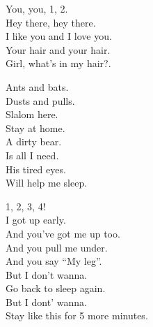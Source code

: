 \begin{specialChapterEnvironment}


\label{ep:teenage-gizzard}




You, you, 1, 2. \\

Hey there, hey there. \\
I like you and I love you. \\
Your hair and your hair. \\

Girl, what's in my hair?. \\




Ants and bats. \\
Dusts and pulls. \\
Slalom here. \\
Stay at home. \\

A dirty bear. \\
Is all I need. \\
His tired eyes. \\
Will help me sleep. \\




1, 2, 3, 4! \\

I got up early. \\
And you've got me up too. \\
And you pull me under. \\
And you say ``My leg''. \\
But I don't wanna. \\
Go back to sleep again. \\
But I dont' wanna. \\
Stay like this for 5 more minutes. \\


\end{specialChapterEnvironment}
